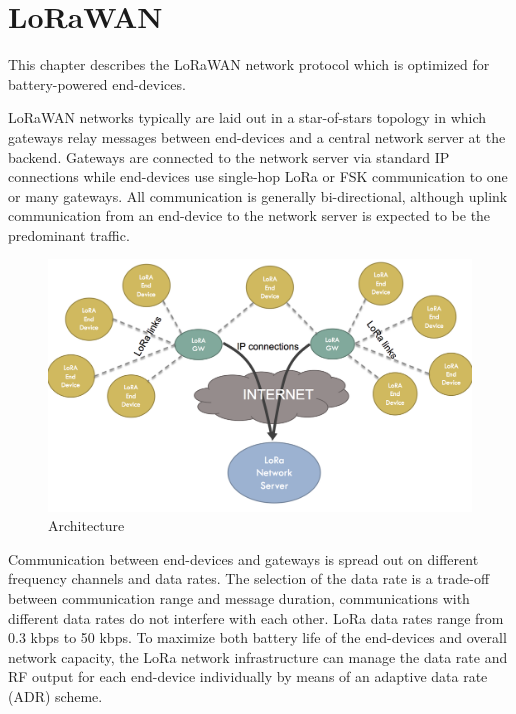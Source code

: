 \chapter{LoRaWAN}
\label{chap:lorawan}

This chapter describes the LoRaWAN network protocol which is optimized for battery-powered end-devices.

LoRaWAN networks typically are laid out in a star-of-stars topology in which gateways relay messages between end-devices and a central network server at the backend. Gateways are connected to the network server via standard IP connections while end-devices use single-hop LoRa or FSK communication to one or many gateways. All communication is generally bi-directional, although uplink communication from an end-device to the network server is expected to be the predominant traffic.


\begin{figure}[h!]
\centering
\includegraphics[width=\textwidth]{img/lora-arch}
\caption{Architecture}
\end{figure}

Communication between end-devices and gateways is spread out on different frequency channels and data rates. The selection of the data rate is a trade-off between communication range and message duration, communications with different data rates do not interfere with each other. LoRa data rates range from 0.3 kbps to 50 kbps. To maximize both battery life of the end-devices and overall network capacity, the LoRa network infrastructure can manage the data rate and RF output for each end-device individually by means of an adaptive data rate (ADR) scheme. \cite{lorawanspec}

